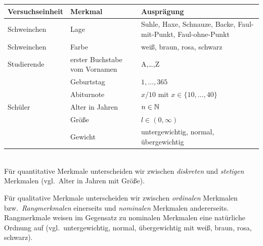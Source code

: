 \begin{bsp}
    \begin{mytable}
        \begin{tabular}{|l|l| p{8cm}|}
            \hline
            \textbf{Versuchseinheit} & \textbf{Merkmal}              & \textbf{Ausprägung}                                           \\
            \hline
            Schweinchen              & Lage                          & Suhle, Haxe, Schnauze, Backe, Faul-mit-Punkt, Faul-ohne-Punkt \\
            Schweinchen              & Farbe                         & weiß, braun, rosa, schwarz                                    \\
            Studierende              & erster Buchstabe vom Vornamen & A,\dots,Z                                                     \\
            & Geburtstag                    & $1,\dots,365$                                                 \\
            & Abiturnote                    & $x/10$ mit $x\in\{10,\dots,40\}$                              \\
            Schüler                  & Alter in Jahren               & $n\in\mathbb{N}$                                                     \\
            & Größe                         & $l\in(0,\infty)$                                              \\
            & Gewicht                       & untergewichtig, normal, übergewichtig                         \\
            \hline
        \end{tabular}
    \end{mytable}
\end{bsp}

\begin{defi}
     \\
    Für quantitative \gls{Merkmal}e unterscheiden wir zwischen \emph{diskreten} und \emph{stetigen} \gls{Merkmal}en (vgl.\ Alter in Jahren mit Größe).

    Für qualitative \gls{Merkmal}e unterscheiden wir zwischen \emph{ordinalen} \gls{Merkmal}en bzw.\ \emph{Rangmerkmalen} einerseits und \emph{nominalen} \gls{Merkmal}en andererseits.
    Rangmerkmale weisen im Gegensatz zu nominalen \gls{Merkmal}en eine natürliche Ordnung auf (vgl.\ untergewichtig, normal, übergewichtig mit weiß, braun, rosa, schwarz).
\end{defi}

